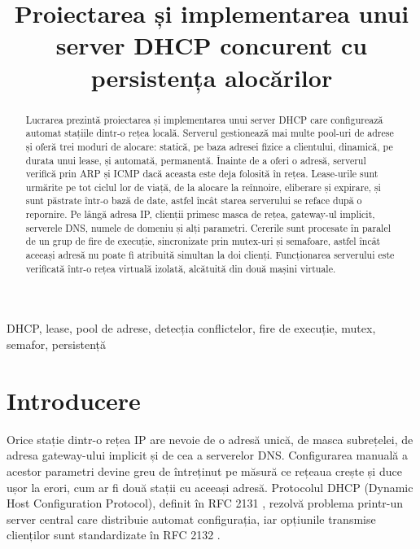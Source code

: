 \documentclass[conference]{IEEEtran}
\begin{document}
\title{Proiectarea și implementarea unui server DHCP concurent cu persistența alocărilor}

\author{
\and
{}
}

\maketitle

\begin{abstract}
Lucrarea prezintă proiectarea și implementarea unui server DHCP care configurează automat stațiile dintr-o rețea locală. Serverul gestionează mai multe pool-uri de adrese și oferă trei moduri de alocare: statică, pe baza adresei fizice a clientului, dinamică, pe durata unui lease, și automată, permanentă. Înainte de a oferi o adresă, serverul verifică prin ARP și ICMP dacă aceasta este deja folosită în rețea. Lease-urile sunt urmărite pe tot ciclul lor de viață, de la alocare la reînnoire, eliberare și expirare, și sunt păstrate într-o bază de date, astfel încât starea serverului se reface după o repornire. Pe lângă adresa IP, clienții primesc masca de rețea, gateway-ul implicit, serverele DNS, numele de domeniu și alți parametri. Cererile sunt procesate în paralel de un grup de fire de execuție, sincronizate prin mutex-uri și semafoare, astfel încât aceeași adresă nu poate fi atribuită simultan la doi clienți. Funcționarea serverului este verificată într-o rețea virtuală izolată, alcătuită din două mașini virtuale.
\end{abstract}

\begin{IEEEkeywords}
DHCP, lease, pool de adrese, detecția conflictelor, fire de execuție, mutex, semafor, persistență
\end{IEEEkeywords}

\section{Introducere}
Orice stație dintr-o rețea IP are nevoie de o adresă unică, de masca subrețelei, de adresa gateway-ului implicit și de cea a serverelor DNS. Configurarea manuală a acestor parametri devine greu de întreținut pe măsură ce rețeaua crește și duce ușor la erori, cum ar fi două stații cu aceeași adresă. Protocolul DHCP (Dynamic Host Configuration Protocol), definit în RFC 2131 \cite{rfc2131}, rezolvă problema printr-un server central care distribuie automat configurația, iar opțiunile transmise clienților sunt standardizate în RFC 2132 \cite{rfc2132}.
\end{document}
